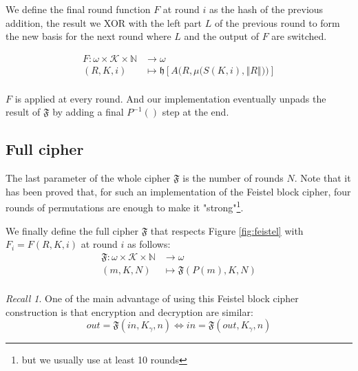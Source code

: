 \documentclass[twoside,twocolumn]{article}
\newcommand{\norm}[1]{\left\Vert#1\right\Vert}
\theoremstyle{definition}
\theoremstyle{remark}
\newtheorem*{recall}{Recall}
\begin{document}
We define the final round function $F$ at round $i$ as the hash of the previous addition, the result we XOR with the left part $L$ of the previous 
round to form the new basis for the next round where $L$ and the output of $F$ are switched.
\begin{small}
    \begin{equation}
        \label{eq:roundFunction}
        \begin{array}{rl}
            F: \omega \times \mathcal{K} \times \mathbb{N}  &\to \omega \\
                (R, K, i)  &\mapsto \mathfrak{h} \left[ A \Bigg(R, \mu \Big( S(K,i), \norm{R} \Big) \Bigg) \right] \\
        \end{array}
    \end{equation}
\end{small}

$F$ is applied at every round. And our implementation eventually unpads the result of $\mathfrak{F}$ by adding a final $P^{-1}()$ step at the end.

\subsection{Full cipher}

The last parameter of the whole cipher $\mathfrak{F}$ is the number of rounds $N$.
Note that it has been proved \cite{Permutations:lr} that, for such an implementation of the Feistel block cipher, four rounds of permutations are 
enough to make it "strong"\footnote{but we usually use at least 10 rounds}.

We finally define the full cipher $\mathfrak{F}$ that respects Figure \ref{fig:feistel} with $F_i = F(R, K, i)$ at round $i$ as follows:
\begin{equation}
    \label{eq:fullCipher}
    \begin{array}{rl}
        \mathfrak{F}: \omega \times \mathcal{K} \times \mathbb{N} &\to \omega \\
                        (m, K, N) &\mapsto \mathfrak{F}(P(m), K, N) \\
    \end{array}
\end{equation}

\begin{recall}
    One of the main advantage of using this Feistel block cipher construction is that encryption and decryption are similar:$$
        out = \mathfrak{F}(in, K_\gamma, n) \iff in = \mathfrak{F}(out, K_\gamma, n)
    $$
\end{recall}
\end{document}

